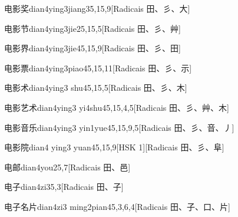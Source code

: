 \begin{entry}{电影奖}{dian4ying3jiang3}{5,15,9}[Radicais ⽥、⼺、⼤]
\end{entry}

\begin{entry}{电影节}{dian4ying3jie2}{5,15,5}[Radicais ⽥、⼺、⾋]
\end{entry}

\begin{entry}{电影界}{dian4ying3jie4}{5,15,9}[Radicais ⽥、⼺、⽥]
\end{entry}

\begin{entry}{电影票}{dian4ying3piao4}{5,15,11}[Radicais ⽥、⼺、⽰]
\end{entry}

\begin{entry}{电影术}{dian4ying3 shu4}{5,15,5}[Radicais ⽥、⼺、⽊]
\end{entry}

\begin{entry}{电影艺术}{dian4ying3 yi4shu4}{5,15,4,5}[Radicais ⽥、⼺、⾋、⽊]
\end{entry}

\begin{entry}{电影音乐}{dian4ying3 yin1yue4}{5,15,9,5}[Radicais ⽥、⼺、⾳、⼃]
\end{entry}

\begin{entry}{电影院}{dian4 ying3 yuan4}{5,15,9}[HSK 1][Radicais ⽥、⼺、⾩]
\end{entry}

\begin{entry}{电邮}{dian4you2}{5,7}[Radicais ⽥、⾢]
\end{entry}

\begin{entry}{电子}{dian4zi3}{5,3}[Radicais ⽥、⼦]
\end{entry}

\begin{entry}{电子名片}{dian4zi3 ming2pian4}{5,3,6,4}[Radicais ⽥、⼦、⼝、⽚]
\end{entry}

